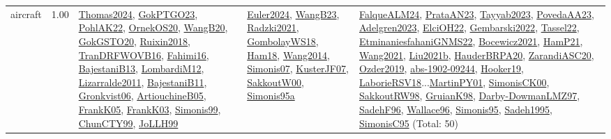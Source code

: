 {\begin{longtable}{p{3cm}r>{\raggedright\arraybackslash}p{6cm}>{\raggedright\arraybackslash}p{6cm}>{\raggedright\arraybackslash}p{8cm}}
\index{aircraft}\index{ApplicationAreas!aircraft}aircraft &  1.00 & \hyperref[detail:Thomas2024]{Thomas2024}, \hyperref[detail:GokPTGO23]{GokPTGO23}, \hyperref[detail:PohlAK22]{PohlAK22}, \hyperref[detail:OrnekOS20]{OrnekOS20}, \hyperref[detail:WangB20]{WangB20}, \hyperref[detail:GokGSTO20]{GokGSTO20}, \hyperref[detail:Ruixin2018]{Ruixin2018}, \hyperref[detail:TranDRFWOVB16]{TranDRFWOVB16}, \hyperref[detail:Fahimi16]{Fahimi16}, \hyperref[detail:BajestaniB13]{BajestaniB13}, \hyperref[detail:LombardiM12]{LombardiM12}, \hyperref[detail:Lizarralde2011]{Lizarralde2011}, \hyperref[detail:BajestaniB11]{BajestaniB11}, \hyperref[detail:Gronkvist06]{Gronkvist06}, \hyperref[detail:ArtiouchineB05]{ArtiouchineB05}, \hyperref[detail:FrankK05]{FrankK05}, \hyperref[detail:FrankK03]{FrankK03}, \hyperref[detail:Simonis99]{Simonis99}, \hyperref[detail:ChunCTY99]{ChunCTY99}, \hyperref[detail:JoLLH99]{JoLLH99} & \hyperref[detail:Euler2024]{Euler2024}, \hyperref[detail:WangB23]{WangB23}, \hyperref[detail:Radzki2021]{Radzki2021}, \hyperref[detail:GombolayWS18]{GombolayWS18}, \hyperref[detail:Ham18]{Ham18}, \hyperref[detail:Wang2014]{Wang2014}, \hyperref[detail:Simonis07]{Simonis07}, \hyperref[detail:KusterJF07]{KusterJF07}, \hyperref[detail:SakkoutW00]{SakkoutW00}, \hyperref[detail:Simonis95a]{Simonis95a} & \hyperref[detail:FalqueALM24]{FalqueALM24}, \hyperref[detail:PrataAN23]{PrataAN23}, \hyperref[detail:Tayyab2023]{Tayyab2023}, \hyperref[detail:PovedaAA23]{PovedaAA23}, \hyperref[detail:Adelgren2023]{Adelgren2023}, \hyperref[detail:ElciOH22]{ElciOH22}, \hyperref[detail:Gembarski2022]{Gembarski2022}, \hyperref[detail:Tassel22]{Tassel22}, \hyperref[detail:EtminaniesfahaniGNMS22]{EtminaniesfahaniGNMS22}, \hyperref[detail:Bocewicz2021]{Bocewicz2021}, \hyperref[detail:HamP21]{HamP21}, \hyperref[detail:Wang2021]{Wang2021}, \hyperref[detail:Liu2021b]{Liu2021b}, \hyperref[detail:HauderBRPA20]{HauderBRPA20}, \hyperref[detail:ZarandiASC20]{ZarandiASC20}, \hyperref[detail:Ozder2019]{Ozder2019}, \hyperref[detail:abs-1902-09244]{abs-1902-09244}, \hyperref[detail:Hooker19]{Hooker19}, \hyperref[detail:LaborieRSV18]{LaborieRSV18}...\hyperref[detail:MartinPY01]{MartinPY01}, \hyperref[detail:SimonisCK00]{SimonisCK00}, \hyperref[detail:SakkoutRW98]{SakkoutRW98}, \hyperref[detail:GruianK98]{GruianK98}, \hyperref[detail:Darby-DowmanLMZ97]{Darby-DowmanLMZ97}, \hyperref[detail:SadehF96]{SadehF96}, \hyperref[detail:Wallace96]{Wallace96}, \hyperref[detail:Simonis95]{Simonis95}, \hyperref[detail:Sadeh1995]{Sadeh1995}, \hyperref[detail:SimonisC95]{SimonisC95} (Total: 50)\\

\end{longtable}}
